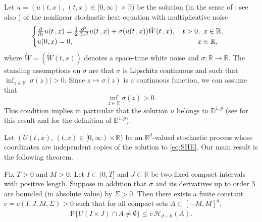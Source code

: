 \documentclass[12pt,a4paper]{article}
\newcommand{\bD}{{\mathbb{D}}}
\newcommand{\R}{{\mathbb{R}}}
\renewcommand{\P}{\mathrm{P}}
\newcommand{\<}{\langle}
\renewcommand{\>}{\rangle}
\begin{document}
Let $u=(u(t, x),\, (t, x) \in [0, \infty) \times \R)$ be the solution (in the sense of \cite{spdewalsh}; see also \cite[Chapter 4]{dss}) of the nonlinear stochastic heat equation with multiplicative noise
\begin{align}\label{eq:SHE}
\begin{cases}
\frac{\partial}{\partial t} u(t\,,x) =\frac{1}{2}\frac{\partial^2}{\partial x^2}u(t\,,x) +\sigma(u(t\,,x)) \dot{W}(t\,,x),\quad  t>0,\ x\in \R,\\
u(0, x) = 0, \hskip 2.45in x \in \R,
\end{cases}
\end{align}
 where $\dot{W} = (\dot{W}(t, x))$ denotes a space-time white noise and $\sigma: \R\to \R$. The standing assumptions on $\sigma$ are that $\sigma$ is  %
 Lipschitz continuous and such that $\inf_{z\in \R} \vert \sigma(z)\vert > 0$. %
 Since $z \mapsto \sigma(z)$ is a continuous function, we can assume that 
 \begin{equation}\label{rd07_02e7}
     \inf_{z\in \R}  \sigma(z) > 0. %
 \end{equation}
 This condition implies in particular that the solution $u$ belongs to $\bD^{1, p}$ (see \cite[Theorem 2.4.3 and Proposition 2.4.4]{nualart2006} for this result and for the definition of $\bD^{1, p}$). %
 
 Let $(U(t\,,x),\, (t, x)\in [0, \infty)\times \R)$ be an $\R^d$-valued stochastic process whose coordinates are independent copies of the solution to \eqref{eq:SHE}.  Our main result is the following theorem.
 
 
\begin{theorem}\label{th:hitting}
Fix $T>0$ and $M>0$. Let $I \subset (0, T]$ and $J\subset \R$ be two fixed compact intervals with positive length. Suppose in addition that $\sigma$ and its derivatives up to order 3 are bounded (in absolute value) by $\Sigma > 0$. Then there exists a finite constant $c = c(I, J,  M, \Sigma)>0$ such that for all compact sets $A\subset [-M, M]^d$, 
\begin{align}\label{rd03_27e3}
           \P\{U(I\times J) \cap A\neq \emptyset\} \leq c\, \mathscr{H}_{d-6}(A).
\end{align}
 \end{theorem}
 
\end{document}
